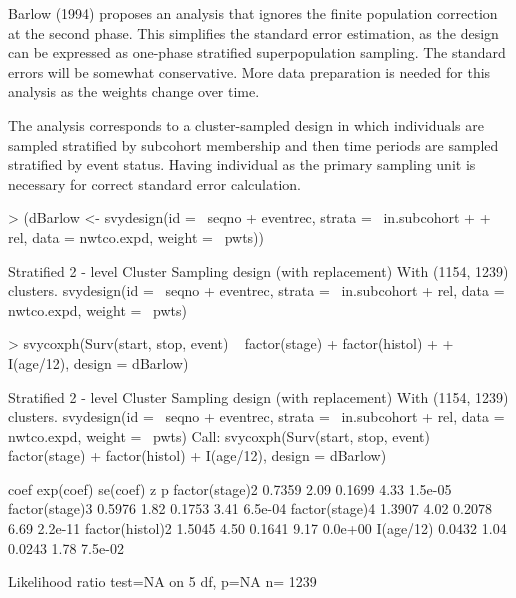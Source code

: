 \documentclass{article}
\begin{document}
Barlow (1994) proposes an analysis that ignores the finite population
correction at the second phase.  This simplifies the standard error
estimation, as the design can be expressed as one-phase stratified
superpopulation sampling. The standard errors will be somewhat
conservative. More data preparation is needed for this analysis as the
weights change over time.
\begin{Schunk}
\end{Schunk}

The analysis corresponds to a cluster-sampled design in which
individuals are sampled stratified by subcohort membership and then
time periods are sampled stratified by event status.  Having
individual as the primary sampling unit is necessary for correct
standard error calculation. 

\begin{Schunk}
\begin{Sinput}
> (dBarlow <- svydesign(id = ~seqno + eventrec, strata = ~in.subcohort + 
+     rel, data = nwtco.expd, weight = ~pwts))
\end{Sinput}
\begin{Soutput}
Stratified 2 - level Cluster Sampling design (with replacement)
With (1154, 1239) clusters.
svydesign(id = ~seqno + eventrec, strata = ~in.subcohort + rel, 
    data = nwtco.expd, weight = ~pwts)
\end{Soutput}
\begin{Sinput}
> svycoxph(Surv(start, stop, event) ~ factor(stage) + factor(histol) + 
+     I(age/12), design = dBarlow)
\end{Sinput}
\begin{Soutput}
Stratified 2 - level Cluster Sampling design (with replacement)
With (1154, 1239) clusters.
svydesign(id = ~seqno + eventrec, strata = ~in.subcohort + rel, 
    data = nwtco.expd, weight = ~pwts)
Call:
svycoxph(Surv(start, stop, event) ~ factor(stage) + factor(histol) + 
    I(age/12), design = dBarlow)


                  coef exp(coef) se(coef)    z       p
factor(stage)2  0.7359      2.09   0.1699 4.33 1.5e-05
factor(stage)3  0.5976      1.82   0.1753 3.41 6.5e-04
factor(stage)4  1.3907      4.02   0.2078 6.69 2.2e-11
factor(histol)2 1.5045      4.50   0.1641 9.17 0.0e+00
I(age/12)       0.0432      1.04   0.0243 1.78 7.5e-02

Likelihood ratio test=NA  on 5 df, p=NA  n= 1239 
\end{Soutput}
\end{Schunk}
\end{document}
